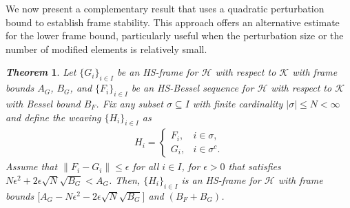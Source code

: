 \documentclass[reqno]{amsart}
\theoremstyle{plain}
\newtheorem{thm}{\it Theorem}[section]
\theoremstyle{remark}
\numberwithin{equation}{section}
\begin{document}
We now present a complementary result that uses a quadratic perturbation bound to establish frame stability. This approach offers an alternative estimate for the lower frame bound, particularly useful when the perturbation size or the number of modified elements is relatively small.
\begin{thm}\label{thm2}
Let  $\{G_i\}_{i \in I}$ be an HS-frame for $\mathcal{H}$ with respect to $\mathcal{K}$ with frame bounds $A_G$, $B_G$, and $\{F_i\}_{i \in I}$ be an HS-Bessel sequence for
$\mathcal{H}$ with respect to $\mathcal{K}$ with Bessel bound $B_F$. Fix any subset $\sigma \subseteq I$ with finite cardinality $|\sigma| \leq N < \infty$ and define the weaving  $\{H_i\}_{i \in I}$ as
\begin{align*}
H_i = \begin{cases}
F_i, & i \in \sigma, \\
G_i, & i \in \sigma^c.
\end{cases}
\end{align*}
Assume that  $\|F_i - G_i\| \leq \epsilon$ for all $i \in I$, for $\epsilon>0$ that satisfies $N\epsilon^2 +2\epsilon\sqrt{N} \sqrt{B_G}<A_G$.
Then,  $\{H_i\}_{i \in I}$ is an HS-frame for $\mathcal{H}$ with frame bounds $\big[A_G-N\epsilon^2 -2\epsilon\sqrt{N} \sqrt{B_G}\big]$ and $(B_F + B_G)$.
\end{thm}
\end{document}
